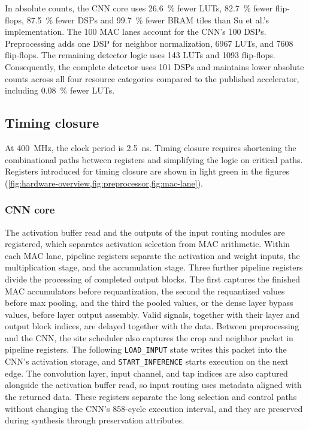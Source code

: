 In absolute counts, the CNN core uses \SI{26.6}{\percent} fewer LUTs, \SI{82.7}{\percent} fewer flip-flops, \SI{87.5}{\percent} fewer DSPs and \SI{99.7}{\percent} fewer BRAM tiles than Su et al.'s implementation.
The 100 MAC lanes account for the CNN's 100 DSPs. Preprocessing adds one DSP for neighbor normalization, \num{6967} LUTs, and \num{7608} flip-flops. The remaining detector logic uses 143 LUTs and \num{1093} flip-flops. Consequently, the complete detector uses 101 DSPs and maintains lower absolute counts across all four resource categories compared to the published accelerator, including \SI{0.08}{\percent} fewer LUTs.

\subsection{Timing closure}\label{sec:timing-closure}

At \SI{400}{\mega\hertz}, the clock period is \SI{2.5}{\nano\second}. Timing closure requires shortening the combinational paths between registers and simplifying the logic on critical paths. Registers introduced for timing closure are shown in light green in the figures (\cref{fig:hardware-overview,fig:preprocessor,fig:mac-lane}).

\subsubsection{CNN core}

The activation buffer read and the outputs of the input routing modules are registered, which separates activation selection from MAC arithmetic. Within each MAC lane, pipeline registers separate the activation and weight inputs, the multiplication stage, and the accumulation stage. Three further pipeline registers divide the processing of completed output blocks. The first captures the finished MAC accumulators before requantization, the second the requantized values before max pooling, and the third the pooled values, or the dense layer bypass values, before layer output assembly. Valid signals, together with their layer and output block indices, are delayed together with the data. Between preprocessing and the CNN, the site scheduler also captures the crop and neighbor packet in pipeline registers. The following \texttt{LOAD\_INPUT} state writes this packet into the CNN's activation storage, and \texttt{START\_INFERENCE} starts execution on the next edge. The convolution layer, input channel, and tap indices are also captured alongside the activation buffer read, so input routing uses metadata aligned with the returned data. These registers separate the long selection and control paths without changing the CNN's 858-cycle execution interval, and they are preserved during synthesis through preservation attributes.

